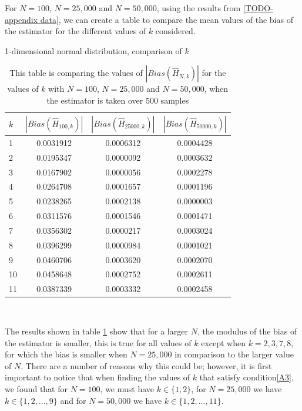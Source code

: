 \documentclass{report}
\begin{document}
For $N=100$, $N=25,000$ and $N=50,000$, using the results from \ref{TODO-appendix data}, we can create a table to compare the mean values of the bias of the estimator for the different values of $k$ considered. 

\begin{table}
\caption{1-dimensional normal distribution, comparison of $k$} \label{normal_kcompare_table}
\begin{center}
\begin{tabular}{| l | c c c |} 
\toprule
$k$ &  $|Bias(\hat{H}_{100, k})|$ & $|Bias(\hat{H}_{25000, k})|$  &  $|Bias(\hat{H}_{50000, k})|$ \\
\midrule[1pt]
1     & 0.0031912    & 0.0006312    & 0.0004428   \\
2     & 0.0195347    & 0.0000092    & 0.0003632   \\
3     & 0.0167902    & 0.0000056    & 0.0002278   \\
4     & 0.0264708    & 0.0001657    & 0.0001196   \\
5     & 0.0238265    & 0.0002138    & 0.0000003   \\
6     & 0.0311576    & 0.0001546    & 0.0001471   \\
7     & 0.0356302    & 0.0000217    & 0.0003024   \\
8     & 0.0396299    & 0.0000984    & 0.0001021   \\
9     & 0.0460706    & 0.0003620    & 0.0002070   \\
10    & 0.0458648    & 0.0002752    & 0.0002611   \\
11    & 0.0387339    & 0.0003332    & 0.0002458   \\
\hline
\end{tabular}
\\[10pt]
\caption*{This table is comparing the values of $|Bias(\hat{H}_{N, k})|$ for the values of $k$ with $N=100$, $N=25,000$ and $N=50,000$, when the estimator is taken over $500$ samples}
\end{center}
\end{table}

The results shown in table \ref{normal_kcompare_table} show that for a larger $N$, the modulus of the bias of the estimator is smaller, this is true for all values of $k$ except when $k=2, 3, 7, 8$, for which the bias is smaller when $N=25,000$ in comparison to the larger value of $N$. There are a number of reasons why this could be; however, it is first important to notice that when finding the values of $k$ that satisfy condition\ref{A3}, we found that for $N=100$, we must have $k \in \{1, 2\}$, for $N=25,000$ we have $k \in \{1, 2, ..., 9 \}$ and for $N=50,000$ we have $k \in \{1, 2, ..., 11\}$.
\end{document}

